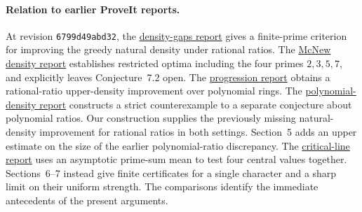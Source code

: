 \documentclass[11pt,letterpaper]{article}
\theoremstyle{definition}\newtheorem{definition}[theorem]{Definition}
\newcommand{\incoming}[2]{\href{https://github.com/VladimirReshetnikov/ProveIt/blob/6799d49abd32ece39c01c82fc984c3a469dea648/docs/incoming/#1}{#2}}
\begin{document}
\paragraph{Relation to earlier ProveIt reports.}
At revision \texttt{6799d49abd32}, the \incoming{grh_transfers_density_gaps_and_zero_tests.zip}{density-gaps report} gives a finite-prime criterion for improving the greedy natural density under rational ratios. The \incoming{mcnew_density_and_grh_transfers.zip}{McNew density report} establishes restricted optima including the four primes $2,3,5,7$, and explicitly leaves Conjecture~7.2 open. The \incoming{grh-progression-densities-and-cubic-prime-race.zip}{progression report} obtains a rational-ratio upper-density improvement over polynomial rings. The \incoming{grh-methods-polynomial-density.zip}{polynomial-density report} constructs a strict counterexample to a separate conjecture about polynomial ratios. Our construction supplies the previously missing natural-density improvement for rational ratios in both settings. Section~5 adds an upper estimate on the size of the earlier polynomial-ratio discrepancy. The \incoming{dirichlet-grh-research.zip}{critical-line report} uses an asymptotic prime-sum mean to test four central values together. Sections~6--7 instead give finite certificates for a single character and a sharp limit on their uniform strength. The comparisons identify the immediate antecedents of the present arguments.





\end{document}
